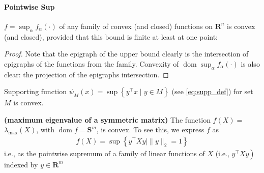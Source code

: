 \documentclass{article}
\newcommand{\bfs}[1]{\textbf{({#1}) }}
\newcommand{\dom}{\operatorname{dom}}
\begin{document}
\paragraph{Pointwise Sup}
$f=\sup _{\alpha} f_{\alpha}(\cdot)$ of any family of convex (and closed) functions on $\mathbf{R}^{n}$ is convex (and closed), provided that this bound is finite at least at one point: 
\begin{proof}\color{ForestGreen}
Note that the epigraph of the upper bound clearly is the intersection of epigraphs of the functions from the family. Convexity of $\dom \sup _{\alpha} f_{\alpha}(\cdot)$ is also clear: the projection of the epigraphs intersection.
\end{proof}
\begin{exma}
Supporting function $\psi_{M}(x)=\sup \left\{y^{\top} x \mid y \in M\right\}$ (see \cref{eq:supp_def}) for  set $M$ is convex.
\end{exma}
\begin{exma}{\bfs{maximum eigenvalue of a symmetric matrix}}
The function $f(X)=$ $\lambda_{\max }(X)$, with $\dom  f=\mathbf{S}^{m}$, is convex. To see this, we express $f$ as
\begin{align*}
f(X)=\sup \left\{y^{\top} X y \mid\|y\|_{2}=1\right\}
\end{align*}
i.e., as the pointwise supremum of a family of linear functions of $X$ (i.e., $\left.y^{\top} X y\right)$ indexed by $y \in \mathbf{R}^{m}$
\end{exma} 
\end{document}
